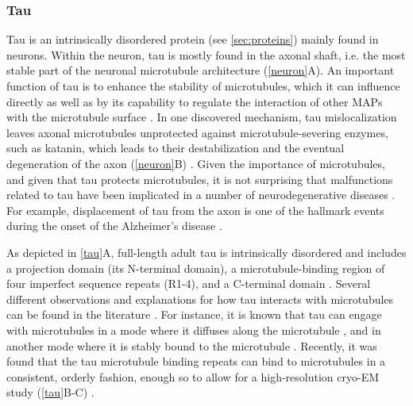 \subsubsection{Tau}
\label{sec:tau_intro}
Tau is an intrinsically disordered protein (see \autoref{sec:proteins}) mainly found in neurons. Within the neuron, tau is mostly found in the axonal shaft, i.e. the most stable part of the neuronal microtubule architecture (\autoref{neuron}A). An important function of tau is to enhance the stability of microtubules, which it can influence directly \parencite{Drechsel1992} as well as by its capability to regulate the interaction of other MAPs with the microtubule surface \parencite{Morris2011b}. In one discovered mechanism, tau mislocalization leaves axonal microtubules unprotected against microtubule-severing enzymes, such as katanin, which leads to their destabilization and the eventual degeneration of the axon (\autoref{neuron}B) \parencite{Qiang2006}. Given the importance of microtubules, and given that tau protects microtubules, it is not surprising that malfunctions related to tau have been implicated in a number of neurodegenerative diseases \parencite{Gao2018,Morris2011b,iqbal2016tau}. For example, displacement of tau from the axon is one of the hallmark events during the onset of the Alzheimer’s disease \parencite{zempel2015tau}.  \par
As depicted in \autoref{tau}A, full-length adult tau is intrinsically disordered and includes a projection domain (its N-terminal domain), a microtubule-binding region of four imperfect sequence repeats (R1-4), and a C-terminal domain \parencite{Himmler1381}. Several different observations and explanations for how tau interacts with microtubules can be found in the literature \parencite{Morris2011b,Mcvicker2014,Kellogg2018}. For instance, it is known that tau can engage with microtubules in a mode where it diffuses along the microtubule \parencite{Hinrichs2012b}, and in another mode where it is stably bound to the microtubule \parencite{Mcvicker2014}. Recently, it was found that the tau microtubule binding repeats can bind to microtubules in a consistent, orderly fashion, enough so to allow for a high-resolution cryo-EM study (\autoref{tau}B-C) \parencite{Kellogg2018}. \par

